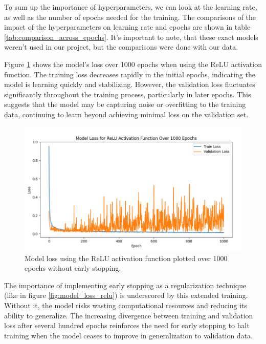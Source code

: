 To sum up the importance of hyperparameters, we can look at the learning rate, as well as the number of epochs needed for the training. The comparisons of the impact of the hyperparameters on learning rate and epochs are shown in table \ref{tab:comparison_across_epochs}. It's important to note, that these exact models weren't used in our project, but the comparisons were done with our data.



Figure \ref{fig:epochs} shows the model's loss over 1000 epochs when using the ReLU activation function. The training loss decreases rapidly in the initial epochs, indicating the model is learning quickly and stabilizing. However, the validation loss fluctuates significantly throughout the training process, particularly in later epochs. This suggests that the model may be capturing noise or overfitting to the training data, continuing to learn beyond achieving minimal loss on the validation set.


\begin{figure}[ht!]
	\centering
	\includegraphics[width=\textwidth]{images/model_loss_over_1000_epochs.png}
	\caption{Model loss using the ReLU activation function plotted over 1000 epochs without early stopping.}
	\label{fig:epochs}
\end{figure}



The importance of implementing early stopping as a regularization technique (like in figure \ref{fig:model_loss_relu}) is underscored by this extended training. Without it, the model risks wasting computational resources and reducing its ability to generalize. The increasing divergence between training and validation loss after several hundred epochs reinforces the need for early stopping to halt training when the model ceases to improve in generalization to validation data.


